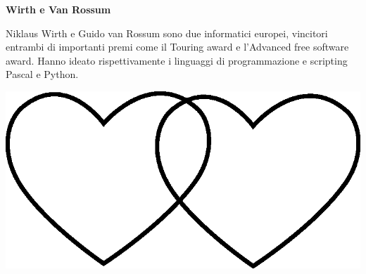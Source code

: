 \documentclass[11pt]{extarticle}
\begin{document}
\vspace*{\fill}
\newpage
\begin{center}
\vspace*{\fill}
{\Huge \textbf{Wirth e Van Rossum\\}}
\vspace*{\fill}
\end{center}
\newpage
{}
\vspace*{\fill}
\begin{center}
Niklaus Wirth e Guido van Rossum sono due informatici europei, vincitori entrambi di importanti premi come il Touring award e l'Advanced free software award. Hanno ideato rispettivamente i linguaggi di programmazione e scripting Pascal e Python.\\
\begin{center}
\includegraphics[scale=0.1]{img/cuori_venn.eps}\\
\end{center}
\end{center}
\vspace*{\fill}
\newpage
\end{document}

